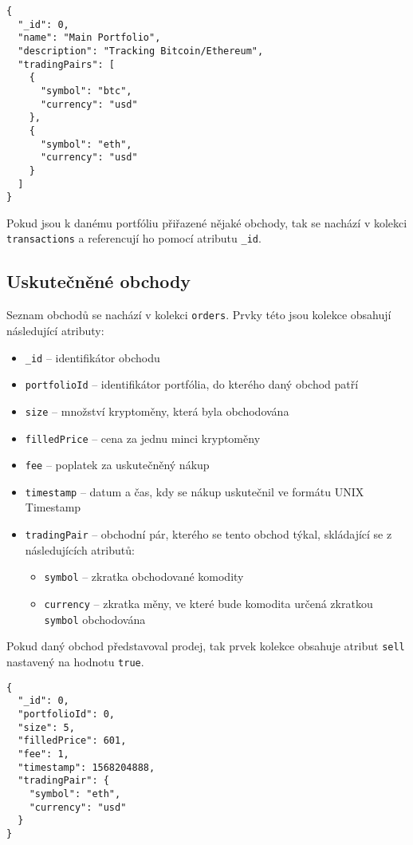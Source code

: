 \documentclass[12pt, a4paper]{article}
\begin{document}
\begin{lstlisting}
{
  "_id": 0,
  "name": "Main Portfolio",
  "description": "Tracking Bitcoin/Ethereum",
  "tradingPairs": [
    {
      "symbol": "btc",
      "currency": "usd"
    },
    {
      "symbol": "eth",
      "currency": "usd"
    }
  ]
}
\end{lstlisting}

Pokud jsou k danému portfóliu přiřazené nějaké obchody, tak se nachází v kolekci \texttt{transactions} a referencují ho pomocí atributu \texttt{\_id}.

\subsection{Uskutečněné obchody}
Seznam obchodů se nachází v kolekci \texttt{orders}. Prvky této jsou kolekce obsahují následující atributy: 
\begin{itemize}
    \item \texttt{\_id} -- identifikátor obchodu
    \item \texttt{portfolioId} -- identifikátor portfólia, do kterého daný obchod patří
    \item \texttt{size} -- množství kryptoměny, která byla obchodována
    \item \texttt{filledPrice} -- cena za jednu minci kryptoměny
    \item \texttt{fee} -- poplatek za uskutečněný nákup
    \item \texttt{timestamp} -- datum a čas, kdy se nákup uskutečnil ve formátu UNIX Timestamp
    \item \texttt{tradingPair} -- obchodní pár, kterého se tento obchod týkal, skládající se z následujících atributů:
        \begin{itemize}
            \item \texttt{symbol} -- zkratka obchodované komodity
            \item \texttt{currency} -- zkratka měny, ve které bude komodita určená zkratkou \texttt{symbol} obchodována
        \end{itemize}
\end{itemize}

Pokud daný obchod představoval prodej, tak prvek kolekce obsahuje atribut \texttt{sell} nastavený na hodnotu \texttt{true}.

\begin{lstlisting}
{
  "_id": 0,
  "portfolioId": 0,
  "size": 5,
  "filledPrice": 601,
  "fee": 1,
  "timestamp": 1568204888,
  "tradingPair": {
    "symbol": "eth",
    "currency": "usd"
  }
}\end{lstlisting}
\end{document}

